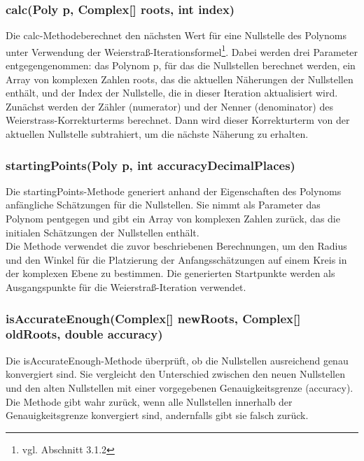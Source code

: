 \documentclass[12pt]{article}
\begin{document}
\subsubsection*{calc(Poly p, Complex[] roots, int index)}
Die \glqq calc-Methode\grqq\space berechnet den nächsten Wert für eine Nullstelle des Polynoms unter Verwendung der Weierstraß-Iterationsformel\footnote{
    vgl. Abschnitt 3.1.2
}. Dabei werden drei Parameter entgegengenommen: das Polynom \glqq p\grqq, für das die Nullstellen berechnet werden, ein Array von komplexen Zahlen \glqq roots\grqq, das die aktuellen Näherungen der Nullstellen enthält, und der Index der Nullstelle, die in dieser Iteration aktualisiert wird.\\
Zunächst werden der Zähler (\glqq numerator\grqq) und der Nenner (\glqq denominator\grqq) des Weierstrass-Korrekturterms berechnet. Dann wird dieser Korrekturterm von der aktuellen Nullstelle subtrahiert, um die nächste Näherung zu erhalten.

\subsubsection*{startingPoints(Poly p, int accuracyDecimalPlaces)}
Die \glqq startingPoints\grqq-Methode generiert anhand der Eigenschaften des Polynoms anfängliche Schätzungen für die Nullstellen. Sie nimmt als Parameter das Polynom \glqq p\grqq\space entgegen und gibt ein Array von komplexen Zahlen zurück, das die initialen Schätzungen der Nullstellen enthält.\\
Die Methode verwendet die zuvor beschriebenen Berechnungen, um den Radius und den Winkel für die Platzierung der Anfangsschätzungen auf einem Kreis in der komplexen Ebene zu bestimmen. Die generierten Startpunkte werden als Ausgangspunkte für die Weierstraß-Iteration verwendet.

\subsubsection*{isAccurateEnough(Complex[] newRoots, Complex[] oldRoots, double accuracy)}
Die \glqq isAccurateEnough\grqq-Methode überprüft, ob die Nullstellen ausreichend genau konvergiert sind. Sie vergleicht den Unterschied zwischen den neuen Nullstellen und den alten Nullstellen mit einer vorgegebenen Genauigkeitsgrenze (\glqq accuracy\grqq).\\
Die Methode gibt wahr zurück, wenn alle Nullstellen innerhalb der Genauigkeitsgrenze konvergiert sind, andernfalls gibt sie falsch zurück.
\end{document}
